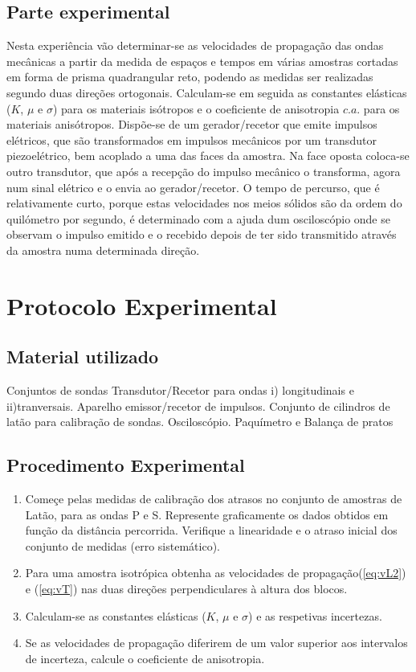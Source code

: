\documentclass[a4paper,12pt]{article}
\begin{document}
\subsection{\sf Parte experimental }
Nesta experiência vão determinar-se as velocidades de propagação das ondas mecânicas a partir da medida de espaços e tempos em várias amostras cortadas em forma de prisma quadrangular reto, podendo as medidas ser realizadas segundo duas direções ortogonais.
 Calculam-se em seguida as constantes elásticas ($K$, $\mu$ e $\sigma$) para os materiais isótropos e o coeficiente de anisotropia $c.a.$ para os materiais anisótropos.
Dispõe-se de um gerador/recetor que emite impulsos elétricos, que são transformados em impulsos mecânicos por um transdutor piezoelétrico, bem acoplado a uma das faces da amostra. Na face oposta coloca-se outro transdutor, que após a recepção do impulso mecânico o transforma, agora num sinal elétrico e o envia ao gerador/recetor.
O tempo de percurso, que é relativamente curto, porque estas velocidades nos meios sólidos são da ordem do quilómetro por segundo, é determinado com a ajuda dum osciloscópio onde se observam o impulso emitido e o recebido depois de ter sido transmitido através da amostra numa determinada direção. 

\newpage
\section{\sf Protocolo Experimental}
\subsection{\sf Material utilizado}
Conjuntos de sondas Transdutor/Recetor para ondas i) longitudinais e ii)tranversais. Aparelho emissor/recetor de impulsos. Conjunto de cilindros de latão para calibração de sondas. Osciloscópio.
Paquímetro e Balança de pratos

\subsection{\sf Procedimento Experimental}

\begin{enumerate}
\item Começe pelas medidas de calibração dos atrasos no conjunto de amostras de Latão, para as ondas P e S. Represente graficamente os  dados obtidos em função da distância percorrida. Verifique a linearidade e o atraso inicial dos conjunto de medidas (erro sistemático).
\item Para uma amostra isotrópica obtenha as velocidades de propagação(\ref{eq:vL2})  e  (\ref{eq:vT}) nas duas direções perpendiculares à altura dos blocos. 
\item Calculam-se as constantes elásticas ($K$, $\mu$ e $\sigma$) e as respetivas incertezas.
\item Se as velocidades de propagação diferirem de um valor superior aos intervalos de incerteza, calcule o coeficiente de anisotropia.
\end{enumerate} 
\end{document}
